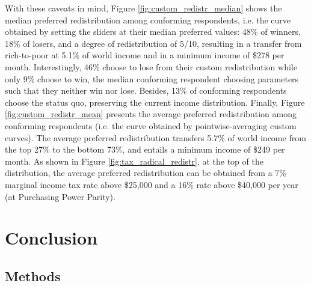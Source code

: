 \documentclass[12pt,english]{article}
\begin{document}
\begin{bibunit}
With these caveats in mind, Figure \ref{fig:custom_redistr_median} shows the median preferred redistribution among conforming respondents, i.e. the curve obtained by setting the sliders at their median preferred values: 48\% of winners, 18\% of losers, and a degree of redistribution of 5/10, resulting in a transfer from rich-to-poor at 5.1\% of world income and in a minimum income of \$278 per month. %
Interestingly, 46\% choose to lose from their custom redistribution while only 9\% choose to win, the median conforming respondent choosing parameters such that they neither win nor lose. Besides, 13\% of conforming respondents choose the status quo, preserving the current income distribution. 
Finally, Figure \ref{fig:custom_redistr_mean} presents the average preferred redistribution among conforming respondents (i.e. the curve obtained by pointwise-averaging custom curves). %
The average preferred redistribution transfers 5.7\% of world income %
from the top 27\% to the bottom 73\%, and entails a minimum income of \$249 per month.  %
As shown in Figure \ref{fig:tax_radical_redistr}, at the top of the distribution, the average preferred redistribution can be obtained from a 7\% marginal income tax rate above \$25,000 and a 16\% rate above \$40,000 per year (at Purchasing Power Parity). 

\section{Conclusion} %




  \begin{small} %
\section*{\normalsize Methods}\label{sec:methods} %


\end{small}
\end{bibunit}
\end{document}
